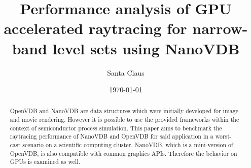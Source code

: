 \documentclass[11pt,a4paper]{article}
\author{Santa Claus}
\date{\today}
\title{Performance analysis of GPU accelerated raytracing for narrow-band level sets using NanoVDB}
\begin{document}
\maketitle



\begin{abstract}
OpenVDB and NanoVDB are data structures which were initially developed for image and movie rendering.
However it is possible to use the provided frameworks within the context of semiconductor process simulation.
This paper aims to benchmark the raytracing performance of NanoVDB and OpenVDB for said application in a worst-cast scenario on a scientific computing cluster.
NanoVDB, which is a mini-version of OpenVDB, is also compatible with common graphics APIs. Therefore the behavior on GPUs is examined as well.
\end{abstract}


\tableofcontents



\newpage
\setcounter{page}{1}






%
%   
\printbibliography
\end{document}
